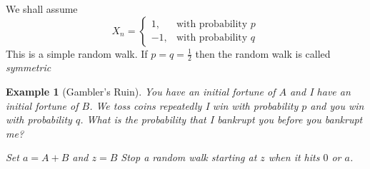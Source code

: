 \documentclass{notes}
\theoremstyle{plain}
\newtheorem*{example}{Example}
\begin{document}
\vspace{3in}
We shall assume
\begin{equation}
X_n = 
\begin{cases}
1,  &\text{with probability $p$}\\
-1, &\text{with probability $q$}
\end{cases}
\end{equation}
This is a simple random walk. If $p=q=\frac{1}{2}$ then the random
walk is called \emph{symmetric}
\begin{example}[Gambler's Ruin]
You have an initial fortune of $A$ and I have an initial fortune of $B$.  We
toss coins repeatedly I win with probability $p$ and you win with
probability $q$. What is the probability that I bankrupt you before you
bankrupt me?

\vspace{3in}

Set $a = A+B$ and $z=B$ Stop a random walk starting at $z$ when it hits
$0$ or $a$.


\end{example}
\end{document}
